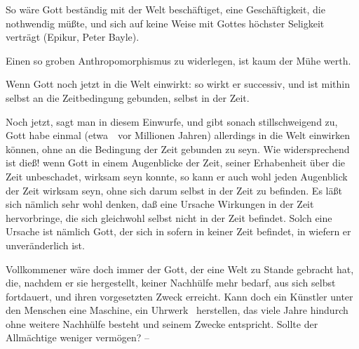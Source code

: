  So wäre Gott beständig mit der Welt beschäftiget, eine Geschäftigkeit, die nothwendig  müßte, und sich auf keine Weise mit Gottes höchster Seligkeit verträgt (Epikur, Peter Bayle).\par
{} Einen so groben Anthropomorphismus zu widerlegen, ist kaum der Mühe werth.\par
{} Wenn Gott noch jetzt in die Welt einwirkt: so wirkt er successiv, und ist mithin selbst an die Zeitbedingung gebunden, selbst in der Zeit.\par
{} Noch jetzt, sagt man in diesem Einwurfe, und gibt sonach stillschweigend zu, Gott habe einmal (etwa~\ vor Millionen Jahren) allerdings in die Welt einwirken können, ohne an die Bedingung der Zeit gebunden zu seyn. Wie widersprechend ist dieß! wenn Gott in einem Augenblicke der Zeit, seiner Erhabenheit über die Zeit unbeschadet, wirksam seyn konnte, so kann er auch wohl jeden Augenblick der Zeit wirksam seyn, ohne sich darum selbst in der Zeit zu befinden. Es läßt sich nämlich sehr wohl denken, daß eine Ursache Wirkungen in der Zeit hervorbringe, die sich gleichwohl selbst nicht in der Zeit befindet. Solch eine Ursache ist nämlich Gott, der sich in sofern in keiner Zeit befindet, in wiefern er unveränderlich ist.\par
{} Vollkommener wäre doch immer der Gott, der eine Welt zu Stande gebracht hat, die, nachdem er sie hergestellt, keiner Nachhülfe mehr bedarf, aus sich selbst fortdauert, und ihren vorgesetzten Zweck erreicht. Kann doch ein Künstler unter den Menschen eine Maschine, ein Uhrwerk \udgl\  herstellen, das viele Jahre hindurch ohne weitere Nachhülfe besteht und seinem Zwecke entspricht. Sollte der Allmächtige weniger vermögen? --\par
{} 
